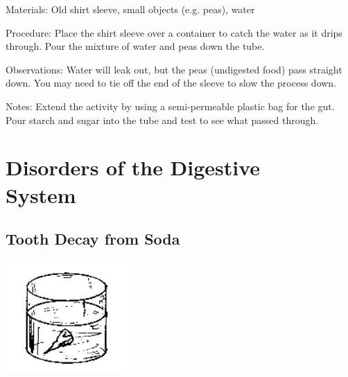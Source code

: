 \begin{multicols}{2}
\begin{description*}
\item[Materials:]{Old shirt sleeve, small objects (e.g. peas), water}
\item[Procedure:]{Place the shirt sleeve over a container to catch the water as it drips
through. Pour the mixture of water and peas down the tube. }
\item[Observations:]{Water
will leak out, but the peas (undigested food) pass straight down. You
may need to tie off the end of the sleeve to slow the process down.}
\item[Notes:]{Extend the activity by using a semi-permeable plastic bag for the gut.
Pour starch and sugar into the tube and test to see what passed
through.}
\end{description*}


\section*{Disorders of the Digestive \hfill \\ System}


\subsection{Tooth Decay from Soda} %

\begin{center}
\includegraphics[width=0.35\textwidth]{./img/source/tooth-decay.png}
\end{center}


\end{multicols}
